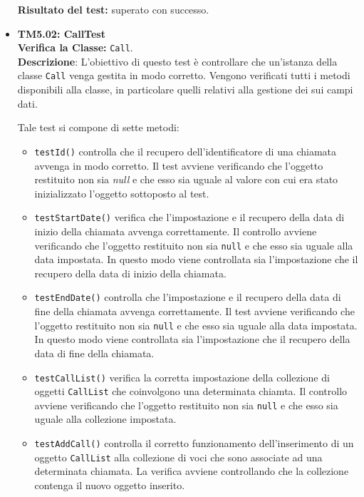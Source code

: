 \begin{itemize}
\begin{itemize}
 
\end{itemize}
\textbf{Risultato del test:} superato con successo.

\item \textbf{TM5.02: CallTest}\\
\textbf{Verifica la Classe:} \texttt{Call}.\\
\textbf{Descrizione}: L'obiettivo di questo test è controllare che un'istanza della classe \texttt{Call} venga gestita in modo corretto. Vengono verificati tutti i metodi disponibili alla classe, in particolare quelli relativi alla gestione dei sui campi dati.


Tale test si compone di sette metodi:
\begin{itemize}
\item \texttt{testId()} controlla che il recupero dell'identificatore di una chiamata avvenga in modo corretto. 
Il test avviene verificando che l'oggetto restituito non sia \textit{null} e che esso sia uguale al valore con cui era stato inizializzato l'oggetto sottoposto al test.
\item \texttt{testStartDate()} verifica che l'impostazione e il recupero della data di inizio della chiamata avvenga correttamente.
Il controllo avviene verificando che l'oggetto restituito non sia \texttt{null} e che esso sia uguale alla data impostata. In questo modo viene controllata sia l'impostazione che il recupero della data di inizio della chiamata.

\item \texttt{testEndDate()} controlla che l'impostazione e il recupero della data di fine della chiamata avvenga correttamente.
Il test avviene verificando che l'oggetto restituito non sia \texttt{null} e che esso sia uguale alla data impostata. In questo modo viene controllata sia l'impostazione che il recupero della data di fine della chiamata.

\item \texttt{testCallList()} verifica la corretta impostazione  della collezione di oggetti \texttt{CallList} che coinvolgono una determinata chiamta. 
Il controllo avviene verificando che l'oggetto restituito non sia \texttt{null} e che esso sia uguale alla collezione impostata.

\item \texttt{testAddCall()} controlla il corretto funzionamento dell'inserimento di un oggetto \texttt{CallList} alla collezione di voci che sono associate ad una determinata chiamata. La verifica avviene controllando che la collezione contenga il nuovo oggetto inserito.


\end{itemize}
\end{itemize}
